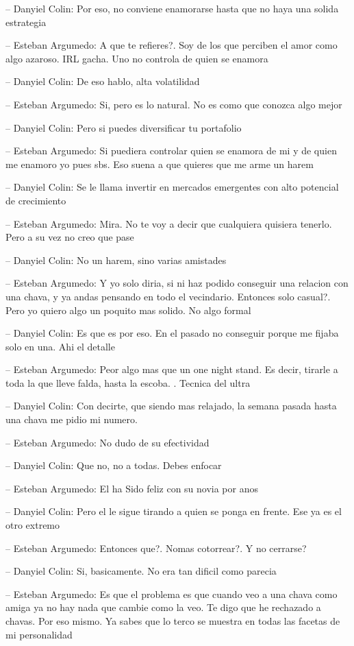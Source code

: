 -- Danyiel Colin: Por eso, no conviene enamorarse hasta que no haya una
solida estrategia

-- Esteban Argumedo: A que te refieres?. Soy de los que perciben el amor
como algo azaroso. IRL gacha. Uno no controla de quien se enamora

-- Danyiel Colin: De eso hablo, alta volatilidad

-- Esteban Argumedo: Si, pero es lo natural. No es como que conozca algo
mejor

-- Danyiel Colin: Pero si puedes diversificar tu portafolio

-- Esteban Argumedo: Si puediera controlar quien se enamora de mi y de
quien me enamoro yo pues sbs. Eso suena a que quieres que me arme un
harem

-- Danyiel Colin: Se le llama invertir en mercados emergentes con alto
potencial de crecimiento

-- Esteban Argumedo: Mira. No te voy a decir que cualquiera quisiera
tenerlo. Pero a su vez no creo que pase

-- Danyiel Colin: No un harem, sino varias amistades

-- Esteban Argumedo: Y yo solo diria, si ni haz podido conseguir una
relacion con una chava, y ya andas pensando en todo el vecindario.
Entonces solo casual?. Pero yo quiero algo un poquito mas solido. No
algo formal

-- Danyiel Colin: Es que es por eso. En el pasado no conseguir porque me
fijaba solo en una. Ahi el detalle

-- Esteban Argumedo: Peor algo mas que un one night stand. Es decir,
tirarle a toda la que lleve falda, hasta la escoba. . Tecnica del ultra

-- Danyiel Colin: Con decirte, que siendo mas relajado, la semana pasada
hasta una chava me pidio mi numero.

-- Esteban Argumedo: No dudo de su efectividad

-- Danyiel Colin: Que no, no a todas. Debes enfocar

-- Esteban Argumedo: El ha Sido feliz con su novia por anos

-- Danyiel Colin: Pero el le sigue tirando a quien se ponga en frente.
Ese ya es el otro extremo

-- Esteban Argumedo: Entonces que?. Nomas cotorrear?. Y no cerrarse?

-- Danyiel Colin: Si, basicamente. No era tan dificil como parecia

-- Esteban Argumedo: Es que el problema es que cuando veo a una chava
como amiga ya no hay nada que cambie como la veo. Te digo que he
rechazado a chavas. Por eso mismo. Ya sabes que lo terco se muestra en
todas las facetas de mi personalidad

